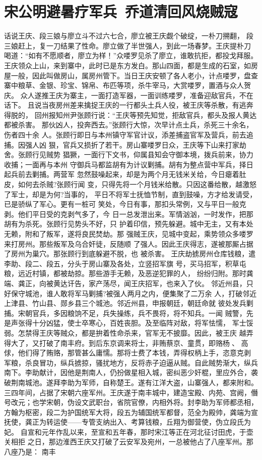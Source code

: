 \chapter{宋公明避暑疗军兵~乔道清回风烧贼寇}

话说王庆、段三娘与廖立斗不过六七合，廖立被王庆觑个破绽，一朴刀搠翻，
段三娘赶上，复一刀结果了性命。廖立做了半世强人，到此一场春梦。王庆提朴刀
喝道：“如有不愿顺者，廖立为样！”众喽罗见杀了廖立，谁敢抗拒，都投戈拜服。
王庆领众上山，来到寨中，此时已是东方发白。那山四面，都是生成的石室，如房
屋一般，因此叫做房山，属房州管下。当日王庆安顿了各人老小，计点喽罗，盘查
寨中粮草、金银、珍宝、锦帛、布匹等项，杀牛宰马，大赏喽罗，置酒与众人贺庆。
众人遂推王庆为寨主，一面打造军器，一面训练喽罗，准备迎敌官兵，不在话下。
且说当夜房州差来擒捉王庆的一行都头土兵人役，被王庆等杀散，有逃奔得脱的，
回州报知州尹张顾行说：“王庆等预先知觉，拒敌官兵，都头及报人黄达都被杀害。
那伙凶人，投奔西去。”张顾行大惊，次早计点土兵，杀死三十余名，伤者四十余
人。张顾行即日与本州镇守军官计议，添差捕盗官军及营兵，前去追捕。因强人凶
狠，官兵又损折了若干。房山寨喽罗日众，王庆等下山来打家劫舍。张顾行见贼势
猖獗，一面行下文书，仰属县知会守御本境，拨兵前来，协力收捕；一面再与本州
守御兵马都监胡有为计议剿捕。胡有为整点营中军兵，择日起兵前去剿捕。两营军
忽然鼓噪起来，却是为两个月无钱米关给，今日瘪着肚皮，如何去杀贼?张顾行闻
变，只得先将一个月钱米给散。只因这番给散，越激怒了军士，却是为何?当事的，
平日不将军士抚恤节制，直到鼓噪，方才给发请受，已是骄纵了军心。更有一桩可
笑处，今日有事，那扣头常例，又与平日一般克剥。他们平日受的克剥气多了，今
日一总发泄出来。军情汹汹，一时发作，把那胡有为杀死。张顾行见势头不好，只
护着印信，预先躲避。城中无主，又有本处无赖，附和了叛军，遂将良民焚劫。那
强贼王庆，见城中变起，乘势领众多喽罗来打房州。那些叛军及乌合奸徒，反随顺
了强人。因此王庆得志，遂被那厮占据了房州为巢穴。那张顾行到底躲避不脱，也
被杀害。
王庆劫掳房州仓库钱粮，遣李助、段二、段五，分头于房山寨及各处，立竖招军旗
号，买马招军，积草屯粮，远近村镇，都被劫掠。那些游手无赖，及恶逆犯罪的人，
纷纷归附。那时龚端、龚正，向被黄达讦告，家产荡尽，闻王庆招军，也来入了伙。
邻近州县，只好保守城池，谁人敢将军马剿捕?被强人两月之内，便集聚了二万余
人，打破邻近上津县、竹山县、郧乡县三个城池。邻近州县，申报朝廷，朝廷命就
彼处发兵剿捕。宋朝官兵，多因粮饷不足，兵失操练，兵不畏将，将不知兵。一闻
贼警，先是声张得十分凶猛，使士卒寒心，百姓丧胆。及至临阵对敌，将军怯懦，
军士馁弱。怎禁得王庆等贼众，都是拚着性命杀来，官军无不披靡。因此，被王庆
越弄得大了，又打破了南丰府。到后东京调来将士，非贿蔡京、童贯，即赂杨、
高俅，他们得了贿赂，那管甚么庸懦。那将士费了本钱，弄得权柄上手，恣意克剥
军粮，杀良冒功，纵兵掳掠，骚扰地方，反将赤子迫逼从贼。自此贼势渐大，纵兵
南下。李助献计，因他是荆南人，仍扮做星相入城，密纠恶少奸棍，里应外合，袭
破荆南城池。遂拜李助为军师，自称楚王。遂有江洋大盗，山寨强人，都来附和。
三四年间，占据了宋朝六座军州。王庆遂于南丰城中，建造宝殿、内苑、宫阙，僭
号改元；也学宋朝，伪设文武职台，省院官僚，内相外将。封李助为军师都丞相，
方翰为枢密，段二为护国统军大将，段五为辅国统军都督，范全为殿帅，龚端为宣
抚使，龚正为转运使——专管支纳出入、考算钱粮，丘翔为御营使，伪立段氏为妃。
自宣和元年作乱以来，至宣和五年春，那时宋江等正在河北征讨田虎，于壶关相拒
之日，那边淮西王庆又打破了云安军及宛州，一总被他占了八座军州。那八座乃是：
南丰

